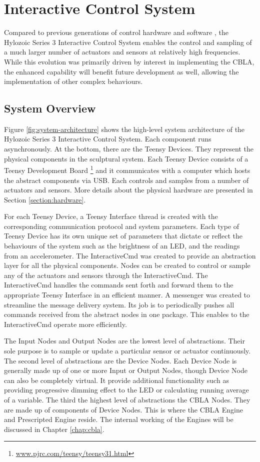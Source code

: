 \chapter{Interactive Control System} \label{chap:ctrl_system}

Compared to previous generations of control hardware and software \cite{Beesley2007.book},  the Hylozoic Series 3 Interactive Control System enables the control and sampling of a much larger number of actuators and sensors at relatively high frequencies.  While this evolution was primarily driven by interest in implementing the CBLA, the enhanced capability will benefit future development as well, allowing the implementation of other complex behaviours.


\section{System Overview}

Figure \ref{fig:system-architecture} shows the high-level system architecture of the Hylozoic Series 3 Interactive Control System. Each component runs asynchronously. At the bottom, there are the Teensy Devices. They represent the physical components in the sculptural system. Each Teensy Device consists of a Teensy Development Board \footnote{\url{www.pjrc.com/teensy/teensy31.html}} and it communicates with a computer which hosts the abstract components via USB. Each controls and samples from a number of actuators and sensors. More details about the physical hardware are presented in Section \ref{section:hardware}. 

For each Teensy Device, a Teensy Interface thread is created with the corresponding communication protocol and system parameters. Each type of Teensy Device has its own unique set of parameters that dictate or reflect the behaviours of the system such as the brightness of an LED, and the readings from an accelerometer. The InteractiveCmd was created to provide an abstraction layer for all the physical components. Nodes can be created to control or sample any of the actuators and sensors through the InteractiveCmd. The InteractiveCmd handles the commands sent forth and forward them to the appropriate Teensy Interface in an efficient manner. A messenger was created to streamline the message delivery system. Its job is to periodically pushes all commands received from the abstract nodes in one package. This enables to the InteractiveCmd operate more efficiently. 

The Input Nodes and Output Nodes are the lowest level of abstractions. Their sole purpose is to sample or update a particular sensor or actuator continuously. The second level of abstractions are the Device Nodes. Each Device Node is generally made up of one or more Input or Output Nodes, though Device Node can also be completely virtual. It provide additional functionality such as providing progressive dimming effect to the LED or calculating running average of a variable. The third the highest level of abstractions the CBLA Nodes. They are made up of components of Device Nodes. This is where the CBLA Engine and Prescripted Engine reside. The internal working of the Engines will be discussed in Chapter \ref{chap:cbla}.

